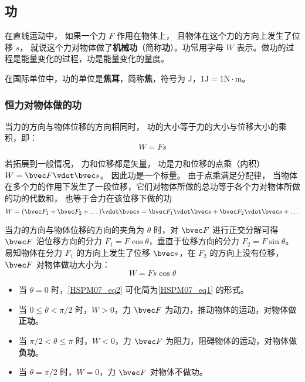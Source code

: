 

\subsection{功}

在直线运动中， 如果一个力 $F$ 作用在物体上， 且物体在这个力的方向上发生了位移 $s$， 就说这个力对物体做了\textbf{机械功}（简称\textbf{功}）。功常用字母 $W$ 表示。做功的过程是能量变化的过程，功是能量变化的量度。

在国际单位中，功的单位是\textbf{焦耳}，简称\textbf{焦}，符号为 $\mathrm{J}$，$1\mathrm{J}=1\mathrm{N \cdot m}$。

\subsubsection{恒力对物体做的功}

当力的方向与物体位移的方向相同时， 功的大小等于力的大小与位移大小的乘积，即：
\begin{equation}\label{HSPM07_eq1}
W=Fs
\end{equation}

若拓展到一般情况， 力和位移都是矢量， 功是力和位移的点乘（内积） $W = \bvec F \vdot \bvec s$。 因此功是一个标量。 由于点乘满足分配律， 当物体在多个力的作用下发生了一段位移，它们对物体所做的总功等于各个力对物体所做的功的代数和， 也等于合力在该位移下做的功
\begin{equation}
W = (\bvec F_1 + \bvec F_2 + \dots)\vdot \bvec s = \bvec F_1 \vdot \bvec s + \bvec F_2 \vdot \bvec s + \dots
\end{equation}

当力的方向与物体位移的方向的夹角为 $\theta$ 时，对 $\bvec F$ 进行正交分解可得 $\bvec F$ 沿位移方向的分力 $F_1=F\cos \theta$，垂直于位移方向的分力 $F_2=F\sin \theta$。易知物体在分力 $F_1$ 的方向上发生了位移 $\bvec s$，在 $F_2$ 的方向上没有位移，$\bvec F$ 对物体做功大小为：
\begin{equation}\label{HSPM07_eq2}
W=Fs\cos \theta
\end{equation}

\begin{itemize}
\item 当 $\theta = 0$ 时，\autoref{HSPM07_eq2} 可化简为\autoref{HSPM07_eq1} 的形式。
\item 当 $0\leq \theta < \pi/2$ 时，$W>0$，力 $\bvec F$ 为动力，推动物体的运动，对物体做\textbf{正功}。
\item 当 $\pi/2< \theta \leq \pi$ 时，$W<0$，力 $\bvec F$ 为阻力，阻碍物体的运动，对物体做\textbf{负功}。
\item 当 $\theta = \pi/2$ 时，$W=0$，力 $\bvec F$ 对物体不做功。
\end{itemize}

